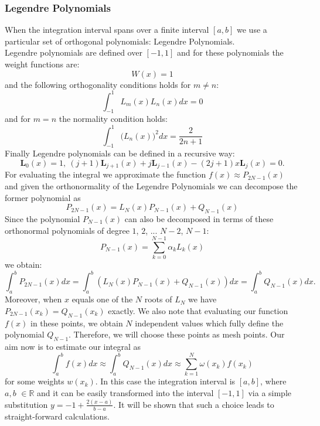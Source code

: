 \documentclass[9pt,a4paper,titlepage]{article}
\begin{document}
\subsubsection{Legendre Polynomials } When the integration interval spans over a finite interval $[a,b]$ we use a particular set of orthogonal polynomials: Legendre Polynomials. 
\\Legendre  polynomials are defined over $[-1,1]$ and for these polynomials the weight functions are:
\begin{equation} 
W(x)= 1
\end{equation}
and the following orthogonality conditions holds for $m\neq n$:
\begin{equation}
\int_{-1}^{1}  L_{m}(x) L_{n}(x) dx=0
\end{equation}
and for $m=n$ the normality condition holds:
\begin{equation}
\int_{-1}^{1} \big(L_{n}(x)\big) ^2 dx=\frac{2}{2n+1}
\end{equation}
Finally Legendre polynomials can be defined in a recursive way: 
\begin{equation}
\textbf{L}_{0}(x)=1, \  
(j+1)\textbf{L}_{j+1}(x)+j\textbf{L}_{j-1}(x)-(2j+1)x\textbf{L}_{j}(x)=0.
\end{equation}
For evaluating the integral we approximate the function $f(x) \approx P_{2N-1}(x)$ and given the orthonormality of the Legendre Polynomials we can decompose the former polynomial as $$P_{2N-1}(x)=L_{N}(x)P_{N-1}(x)+Q_{N-1}(x)$$ 
Since the polynomial $P_{N-1}(x)$ can also be decomposed in terms of these orthonormal polynomials of degree $1$, $2$, ... $N-2$, $N-1$: 
\begin{equation}
P_{N-1}(x)=\sum_{k=0}^{N-1} \alpha_{k}L_{k}(x)
\end{equation}
we obtain:
\begin{equation}
\int_{a}^{b} P_{2N-1}(x)dx=\int_{a}^{b}(L_{N}(x)P_{N-1}(x)+Q_{N-1}(x))dx=\int_{a}^{b}Q_{N-1}(x)dx.
\end{equation}
Moreover, when $x$ equals one of the $N$ roots of $L_{N}$ we have $P_{2N-1}(x_{k})=Q_{N-1}(x_{k})$ exactly. We also note that evaluating our function $f(x)$ in these points, we obtain $N$ independent values which fully define the polynomial $Q_{N-1}$. Therefore, we will choose these points as mesh points.
Our aim now is to estimate our integral as 
\begin{equation}
\int_{a}^{b}f(x)dx \approx \int_{a}^{b}Q_{N-1}(x)dx \approx \sum_{k=1}^{N} \omega(x_{k})f(x_k)
\end{equation}
for some weights $w(x_k)$. In this case the integration interval is $[a,b]$, where $a,b$ $\in \mathbb{R}$ and it can be easily transformed into the interval $[-1,1]$ via a simple substitution $y=-1+\frac{2(x-a)}{b-a}$. It will be shown that such a choice leads to straight-forward calculations.
\end{document}
